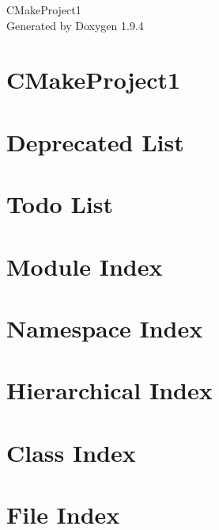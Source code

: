\documentclass[twoside]{book}
\newcommand{\+}{\discretionary{\mbox{\scriptsize$\hookleftarrow$}}{}{}}
\newcommand{\clearemptydoublepage}{%
    \newpage{\pagestyle{empty}\cleardoublepage}%
  }
\begin{document}
  \raggedbottom
    \hypersetup{pageanchor=false,
                bookmarksnumbered=true,
                pdfencoding=unicode
               }
  \begin{titlepage}
  \vspace*{7cm}
  \begin{center}%
  {\Large CMake\+Project1}\\
  \vspace*{1cm}
  {\large Generated by Doxygen 1.9.4}\\
  \end{center}
  \end{titlepage}
  \clearemptydoublepage
  \tableofcontents
  \clearemptydoublepage
  \hypersetup{pageanchor=true}
\chapter{CMake\+Project1}
\label{md__r_e_a_d_m_e}

\chapter{Deprecated List}
\label{deprecated}

\chapter{Todo List}
\label{todo}

\chapter{Module Index}

\chapter{Namespace Index}

\chapter{Hierarchical Index}

\chapter{Class Index}

\chapter{File Index}

\end{document}
